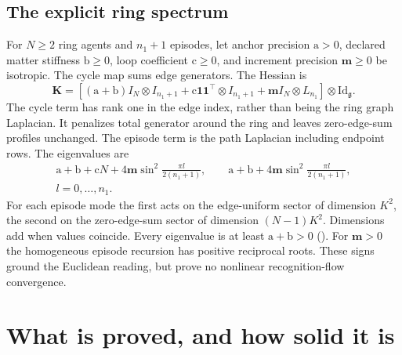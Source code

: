 \subsection{The explicit ring spectrum}

For \(N\geq2\) ring agents and \(n_1+1\) episodes, let anchor precision \(\mathrm a>0\),
declared matter stiffness \(\mathrm b\geq0\), loop coefficient \(\mathrm c\geq0\), and increment
precision \(\mathbf m\geq0\) be isotropic. The cycle map sums edge generators. The Hessian is
\[
\mathbf K=\left[(\mathrm a+\mathrm b)I_N\otimes I_{n_1+1}
+\mathrm c\mathbf1\mathbf1^\top\otimes I_{n_1+1}
+\mathbf m I_N\otimes L_{n_1}\right]\otimes\mathrm{Id}_{\mathfrak g}.
\]
The cycle term has rank one in the edge index, rather than being the ring graph Laplacian. It
penalizes total generator around the ring and leaves zero-edge-sum profiles unchanged. The episode
term is the path Laplacian including endpoint rows. The eigenvalues are
\[
\begin{gathered}
\mathrm a+\mathrm b+\mathrm cN+4\mathbf m\sin^2\frac{\pi l}{2(n_1+1)},\qquad
\mathrm a+\mathrm b+4\mathbf m\sin^2\frac{\pi l}{2(n_1+1)},\\
l=0,\ldots,n_1.
\end{gathered}
\]
For each episode mode the first acts on the edge-uniform sector of dimension \(K^2\), the second
on the zero-edge-sum sector of dimension \((N-1)K^2\). Dimensions add when values coincide.
Every eigenvalue is at least \(\mathrm a+\mathrm b>0\) (). For
\(\mathbf m>0\) the homogeneous episode recursion has positive reciprocal roots. These signs
ground the Euclidean reading, but prove no nonlinear recognition-flow convergence.

\section{What is proved, and how solid it is}

